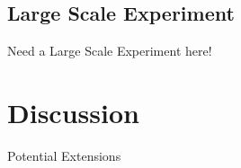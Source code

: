 \documentclass{sig-alternate-05-2015}
\begin{document}
%

\subsection{Large Scale Experiment}
Need a Large Scale Experiment here! 


\section{Discussion}
Potential Extensions
\end{document}
